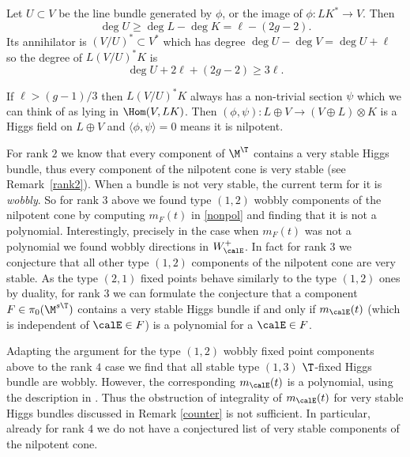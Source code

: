 \begin{remark}
	Let $U\subset V$ be the line bundle generated by $\phi$, or the image of $\phi:LK^*\rightarrow V$. Then
	$$\deg U\ge \deg L-\deg K=\ell-(2g-2).$$
	Its annihilator is $(V/U)^*\subset V^*$ which has degree
	$\deg U-\deg V=\deg U+\ell$ so the degree of $L(V/U)^*K$ is
	$$\deg U+2\ell +(2g-2)\ge 3\ell.$$

	If $\ell>(g-1)/3$ then $L(V/U)^*K$ always has a non-trivial section $\psi$ which we can think of as lying in $\Hom(V, LK)$.
	Then $(\phi,\psi):L\oplus V\rightarrow (V\oplus L)\otimes K$ is a Higgs field on $L\oplus V$ and $\langle \phi,\psi\rangle = 0$ means it is nilpotent.


\end{remark}

\begin{remark}
\notready \label{obstruction}  For rank $2$ we know that every component of $\M^\T$ contains a very stable Higgs bundle, thus every component of the nilpotent cone is very stable (see Remark~\ref{rank2}). When a bundle is not very stable, the current term for it is {\em wobbly}. So for  rank $3$ above we found type $(1,2)$ wobbly components of the nilpotent cone by computing $m_{F}(t)$  in \eqref{nonpol} and finding that it is not a polynomial. Interestingly, precisely in the case when $m_{F}(t)$ was not a polynomial we found wobbly directions in $W^+_\calE$.    In fact  for rank $3$ we conjecture that all other type $(1,2)$ components of the nilpotent cone are very stable. As the type $(2,1)$ fixed points behave similarly to the type $(1,2)$ ones by duality, for rank $3$ we can formulate the conjecture that a component  $F\in \pi_0(\M^{s\T})$ contains a very stable Higgs bundle if and only if $m_{\calE}(t)$ (which is independent of $\calE\in F$) is a polynomial for a $\calE\in F$.

	Adapting the argument for the type $(1,2)$ wobbly fixed point components above to the rank  $4$ case  we find that all stable type $(1,3)$ $\T$-fixed Higgs bundle are  wobbly. However,  the corresponding $m_\calE(t)$ is a polynomial, using the description in \cite[Example 6.6]{garcia-prada-heinloth-schmitt}.
	Thus the obstruction of integrality of $m_\calE(t)$  for very stable Higgs bundles discussed in Remark  \ref{counter} is not sufficient. In particular, already for rank $4$ we do not have a conjectured list of very stable components of the nilpotent cone.

\end{remark}

